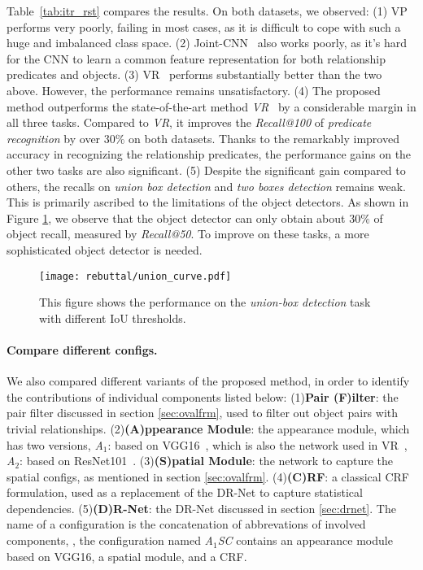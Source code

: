 \documentclass[10pt,twocolumn,letterpaper]{article}
\begin{document}
Table~\ref{tab:itr_rst} compares the results. On both datasets, we observed:
(1) VP~\cite{sadeghi2011recognition} performs very poorly, failing in most cases,
as it is difficult to cope with such a huge and imbalanced class space.
(2) Joint-CNN~\cite{fang2015captions} also works poorly, as
it's hard for the CNN to learn a common feature representation for both
relationship predicates and objects.
(3) VR~\cite{lu2016visual} performs substantially better than the two above.
However, the performance remains unsatisfactory.
(4) The proposed method outperforms the state-of-the-art method \emph{VR}~\cite{lu2016visual} by a considerable margin
in all three tasks.
Compared to \emph{VR}, it improves the \emph{Recall@100} of \emph{predicate recognition} by over $30\%$ on both datasets.
Thanks to the remarkably improved accuracy in recognizing the relationship predicates,
the performance gains on the other two tasks are also significant.
(5) Despite the significant gain compared to others,
the recalls on \emph{union box detection} and \emph{two boxes detection}
remains weak. This is primarily ascribed to the limitations of the object detectors.
As shown in Figure \ref{fig:iou_relax}, we observe that
the object detector can only obtain about $30\%$ of object recall, measured by \emph{Recall@50}.
To improve on these tasks, a more sophisticated object detector is needed.

\begin{figure}
	\centering
	\texttt{[image: rebuttal/union\_curve.pdf]}
	\caption{\small This figure shows the performance on the \emph{union-box detection} task with different IoU thresholds.}
	\label{fig:iou_relax}
\end{figure}\paragraph{Compare different configs.}

We also compared different variants of the proposed method, in order
to identify the contributions of individual components listed below:
(1)\textbf{Pair (F)ilter}: the pair filter discussed in section \ref{sec:ovalfrm},
used to filter out object pairs with trivial relationships.
(2)\textbf{(A)ppearance Module}: the appearance module, which has two versions,
\emph{A$_1$}: based on VGG16~\cite{Simonyan14c}, which is also the network used in VR~\cite{lu2016visual},
\emph{A$_2$}: based on ResNet101~\cite{he2015deep}.
(3)\textbf{(S)patial Module}: the network to capture the spatial configs, as mentioned in section \ref{sec:ovalfrm}.
(4)\textbf{(C)RF}: a classical CRF formulation, used as a replacement of the DR-Net to capture statistical dependencies.
(5)\textbf{(D)R-Net}: the DR-Net discussed in section \ref{sec:drnet}.
The name of a configuration is the concatenation of abbrevations of involved components,
\eg, the configuration named \emph{A$_1$SC} contains an appearance module based on VGG16, a spatial module, and a CRF.
\end{document}
